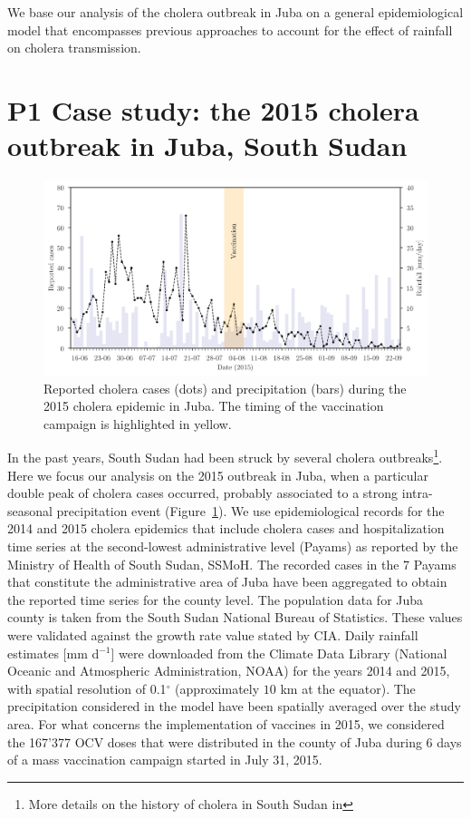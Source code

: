 We base our analysis of the cholera outbreak in Juba on a general epidemiological model that encompasses previous approaches to account for the effect of rainfall on cholera transmission. %


\section{P1 Case study: the 2015 cholera outbreak in Juba, South Sudan}\label{sec:data sets}
\begin{figure}\centering
  \includegraphics[width=\textwidth]{fig_cholera-rainfall/Lemaitre_ACTROP_2018_42_R1_fig2.png}
  \caption{Reported cholera cases (dots) and precipitation (bars) during the 2015 cholera epidemic in Juba. The timing of the vaccination campaign is highlighted in yellow.}
  \label{fig:report}
\end{figure}
In the past years, South Sudan had been struck by several cholera outbreaks\footnote{More details on the history of cholera in South Sudan in }. Here we focus our analysis on the 2015 outbreak in Juba, when a particular double peak of cholera cases occurred, probably associated to a strong intra-seasonal precipitation event (Figure~\ref{fig:report}). We use epidemiological records for the 2014 and 2015 cholera epidemics that include cholera cases and hospitalization time series at the second-lowest administrative level  (Payams) as reported by the Ministry of Health of South Sudan, SSMoH. The recorded cases in the 7 Payams that constitute the administrative area of Juba have been aggregated to obtain the reported time series for the county level. The population data for Juba county is taken from the South Sudan National Bureau of Statistics\cite{SSNBS:PopulationProjectionsSouth:2015}.
These values were validated against the growth rate value stated by CIA\cite{CIA:SouthSudan:2015}. Daily rainfall estimates [mm d$^{-1}$] were downloaded from the Climate Data Library (National Oceanic and Atmospheric Administration, NOAA)\cite{IRI/LDEO:ClimateDataLibrary:2016} for the years 2014 and 2015, with spatial resolution of {0.1}$^\circ$ (approximately $10$ km at the equator). The precipitation considered in the model have been spatially averaged over the study area. For what concerns the implementation of vaccines in 2015, we considered the 167'377 OCV doses that were distributed in the county of Juba\cite{Abubakar:FirstUseGlobal:2015,Azman:EffectivenessOneDose:2016,Parker:AdaptingGlobalShortage:2017} during 6 days of a mass vaccination campaign started in July 31, 2015.

